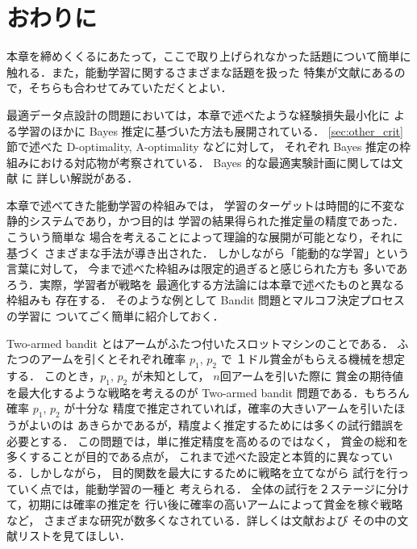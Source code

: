 \documentclass[master]{cimt}
\begin{document}




\section{おわりに}
\label{sec:final}
本章を締めくくるにあたって，ここで取り上げられなかった話題について簡単に
触れる．また，能動学習に関するさまざまな話題を扱った
特集が文献\cite{ipsj97}にあるので，そちらも合わせてみていただくとよい．

最適データ点設計の問題においては，本章で述べたような経験損失最小化に
よる学習のほかに Bayes 推定に基づいた方法も展開されている．
\ref{sec:other_crit}節で述べた D-optimality, A-optimality などに対して，
それぞれ
Bayes 推定の枠組みにおける対応物が考察されている．
Bayes 的な最適実験計画に関しては文献 \cite{ChalonerVerdinelli}に
詳しい解説がある．

本章で述べてきた能動学習の枠組みでは，
学習のターゲットは時間的に不変な静的システムであり，かつ目的は
学習の結果得られた推定量の精度であった．こういう簡単な
場合を考えることによって理論的な展開が可能となり，それに基づく
さまざまな手法が導き出された．
しかしながら「能動的な学習」という言葉に対して，
今まで述べた枠組みは限定的過ぎると感じられた方も
多いであろう．実際，学習者が戦略を
最適化する方法論には本章で述べたものと異なる枠組みも
存在する．
そのような例として Bandit 問題とマルコフ決定プロセスの学習に
ついてごく簡単に紹介しておく．

Two-armed bandit とはアームがふたつ付いたスロットマシンのことである．
ふたつのアームを引くとそれぞれ確率 $p_1$, $p_2$ で
１ドル賞金がもらえる機械を想定する．
このとき，$p_1$, $p_2$ が未知として，
$n$回アームを引いた際に
賞金の期待値を最大化するような戦略を考えるのが
Two-armed bandit 問題である．もちろん確率 $p_1$, $p_2$ が十分な
精度で推定されていれば，確率の大きいアームを引いたほうがよいのは
あきらかであるが，精度よく推定するためには多くの試行錯誤を必要とする．
この問題では，単に推定精度を高めるのではなく，
賞金の総和を多くすることが目的である点が，
これまで述べた設定と本質的に異なっている．しかしながら，
目的関数を最大にするために戦略を立てながら
試行を行っていく点では，能動学習の一種と
考えられる．
全体の試行を２ステージに分けて，初期には確率の推定を
行い後に確率の高いアームによって賞金を稼ぐ戦略など，
さまざまな研究が数多くなされている．詳しくは文献\cite{Bandit}および
その中の文献リストを見てほしい．
\end{document}
